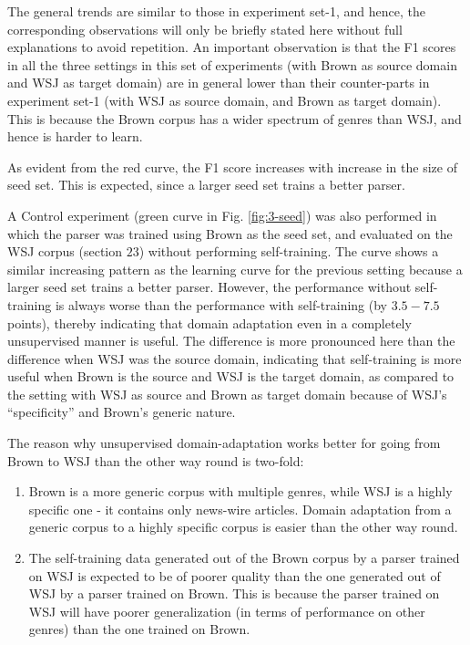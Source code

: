 \documentclass{sig-alternate-05-2015}
\begin{document}
The general trends are similar to those in experiment set-1, and hence, the corresponding observations will only be briefly stated here without full explanations to avoid repetition. An important observation is that the F1 scores in all the three settings in this set of experiments (with Brown as source domain and WSJ as target domain) are in general lower than their counter-parts in experiment set-1 (with WSJ as source domain, and Brown as target domain). This is because the Brown corpus has a wider spectrum of genres than WSJ, and hence is harder to learn.

As evident from the red curve, the F1 score increases with increase in the size of seed set. This is expected, since a larger seed set trains a better parser.

A Control experiment (green curve in Fig. \ref{fig:3-seed}) was also performed in which the parser was trained using Brown as the seed set, and evaluated on the WSJ corpus (section $23$) without performing self-training. The curve shows a similar increasing pattern as the learning curve for the previous setting because a larger seed set trains a better parser. However, the performance without self-training is always worse than the performance with self-training (by $3.5-7.5$ points), thereby indicating that domain adaptation even in a completely unsupervised manner is useful. The difference is more pronounced here than the difference when WSJ was the source domain, indicating that self-training is more useful when Brown is the source and WSJ is the target domain, as compared to the setting with WSJ as source and Brown as target domain because of WSJ's ``specificity'' and Brown's generic nature.

The reason why unsupervised domain-adaptation works better for going from Brown to WSJ than the other way round is two-fold:
\begin{enumerate}
\item Brown is a more generic corpus with multiple genres, while WSJ is a highly specific one - it contains only news-wire articles. Domain adaptation from a generic corpus to a highly specific corpus is easier than the other way round.
\item The self-training data generated out of the Brown corpus by a parser trained on WSJ is expected to be of poorer quality than the one generated out of WSJ by a parser trained on Brown. This is because the parser trained on WSJ will have poorer generalization (in terms of performance on other genres) than the one trained on Brown.
\end{enumerate}
\end{document}
